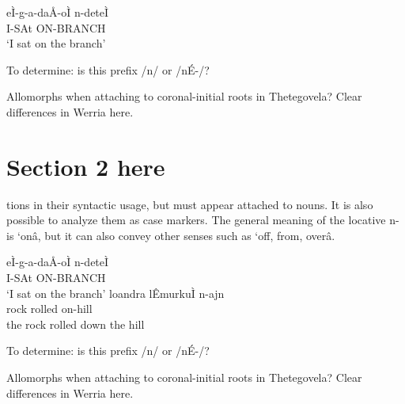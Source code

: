 	\ea \gll eÌ-g-a-daÅ-oÌ n-deteÌ		\\	
			I-SAt ON-BRANCH\\
		\glt `I sat on the branch'	
\z 

To determine: is this prefix /n/ or /nÉ-/?

Allomorphs when attaching to coronal-initial roots in Thetegovela? Clear differences in Werria here.


\section{Section 2 here}

tions in their syntactic usage, but must appear attached to nouns. It is also possible to analyze them as case markers. The general meaning of the locative n- is `onâ, but it can also convey other senses such as `off, from, overâ.  

	\ea \gll eÌ-g-a-daÅ-oÌ n-deteÌ		\\	
			I-SAt ON-BRANCH\\
		\glt `I sat on the branch'	
	\ex \gll loandra lÊmurkuÌ n-ajn		 \\
			rock rolled on-hill\\
		\glt the rock rolled down the hill
\z 

To determine: is this prefix /n/ or /nÉ-/?

Allomorphs when attaching to coronal-initial roots in Thetegovela? Clear differences in Werria here.

